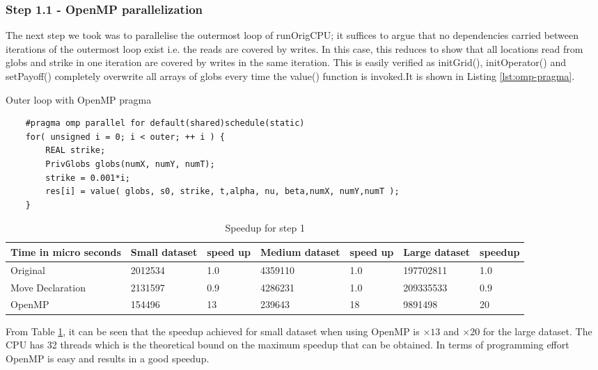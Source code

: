 \documentclass{article}
\begin{document}
\subsubsection*{Step 1.1 - OpenMP parallelization}
The next step we took was to parallelise the outermost loop of runOrigCPU; it suffices to argue that no dependencies
carried between iterations of the outermost loop exist i.e. the reads are covered by writes. In this case, this reduces to
show that all locations read from globs and strike in one iteration are covered by writes
in the same iteration. This is easily verified as initGrid(), initOperator() and setPayoff() completely overwrite all arrays of globs every time the value() function is invoked.It is shown in Listing \ref{lst:omp-pragma}.
\begin{listing}[ht]
\caption{Outer loop with OpenMP pragma} \label{lst:omp-pragma}
\begin{verbatim}
    #pragma omp parallel for default(shared)schedule(static)
    for( unsigned i = 0; i < outer; ++ i ) {
        REAL strike;
        PrivGlobs globs(numX, numY, numT);
        strike = 0.001*i;
        res[i] = value( globs, s0, strike, t,alpha, nu, beta,numX, numY,numT );
    }  
\end{verbatim}
\end{listing}


\begin{table}[ht]
\centering
\caption{Speedup for step 1}
\label{tab:my-label1}
\begin{tabular}{|l|l|l|l|l|l|l|}
\hline
Time in micro seconds& Small dataset & speed up & Medium dataset & speed up & Large dataset & speedup \\ \hline
Original         & 2012534       &  1.0        & 4359110        &  1.0        & 197702811     &  1.0       \\ \hline
Move Declaration & 2131597       &  0.9        & 4286231        &  1.0        & 209335533     &  0.9       \\ \hline
OpenMP           & 154496        &  13         & 239643         &  18         & 9891498       &  20       \\ \hline
\end{tabular}
\end{table}

From Table \ref{tab:my-label1}, it can be seen that the speedup achieved for small dataset when using OpenMP is $\times13$ and  $\times20$ for the large dataset. The CPU has 32 threads which is the theoretical bound on the maximum speedup that can be obtained. In terms of programming effort OpenMP is easy and results in a good speedup.
\end{document}
